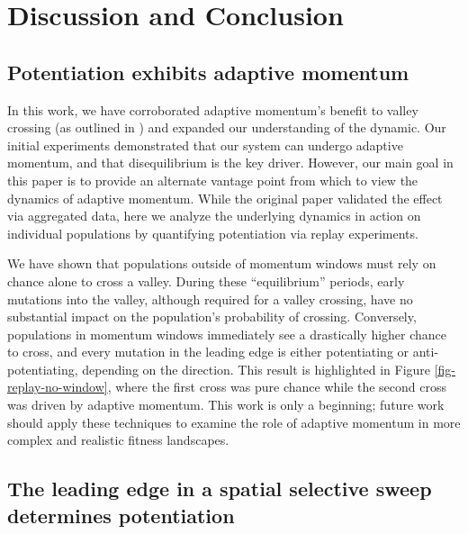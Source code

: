 \section{Discussion and Conclusion}

\subsection{Potentiation exhibits adaptive momentum}

In this work, we have corroborated adaptive momentum's benefit to valley crossing (as outlined in \citep{Bohm2024.04.08.588357}) and expanded our understanding of the dynamic. 
Our initial experiments demonstrated that our system can undergo adaptive momentum, and that disequilibrium is the key driver. 
However, our main goal in this paper is to provide an alternate vantage point from which to view the dynamics of adaptive momentum. 
While the original paper validated the effect via aggregated data, here we analyze the underlying dynamics in action on individual populations by quantifying potentiation via replay experiments. 

We have shown that populations outside of momentum windows must rely on chance alone to cross a valley. 
During these ``equilibrium'' periods, early mutations into the valley, although required for a valley crossing, have no substantial impact on the population's probability of crossing. 
Conversely, populations in momentum windows immediately see a drastically higher chance to cross, and every mutation in the leading edge is either potentiating or anti-potentiating, depending on the direction. 
This result is highlighted in Figure \ref{fig-replay-no-window}, where the first cross was pure chance while the second cross was driven by adaptive momentum.
This work is only a beginning; future work should apply these techniques to examine the role of adaptive momentum in more complex and realistic fitness landscapes.



\subsection{The leading edge in a spatial selective sweep determines potentiation}

